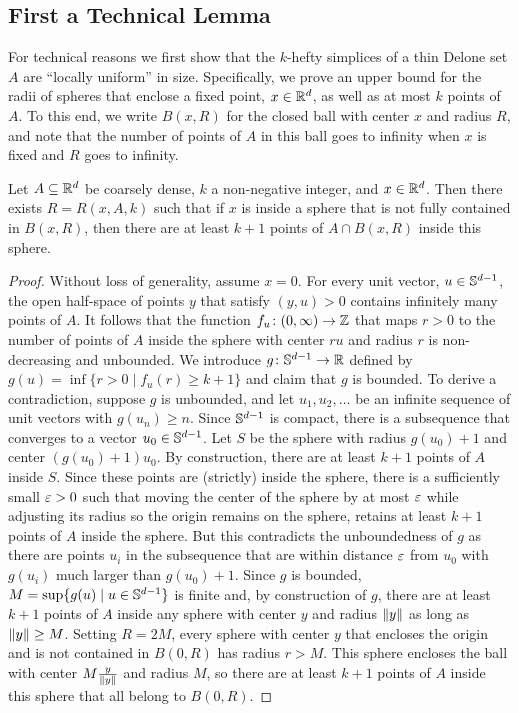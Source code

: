 \documentclass[a4paper,UKenglish,cleveref, autoref,numberwithinsect]{socg-lipics-v2021}
\newcommand {\mm}[1] {\ifmmode{#1}\else{\mbox{\(#1\)}}\fi}
\theoremstyle{plain}
\newcommand{\Rspace}        {\mm{{\mathbb R}}}
\newcommand{\Sspace}        {\mm{{\mathbb S}}}
\newcommand{\Zspace}        {\mm{{\mathbb Z}}}
\newcommand{\norm}[1]       {\mm{\|{#1}\|}}
\newcommand{\ee}            {\mm{\varepsilon}}
\begin{document}
\subsection{First a Technical Lemma}
\label{sec:2.1}
For technical reasons we first show that the $k$-hefty simplices of a thin Delone set $A$ are ``locally uniform'' in size.
Specifically, we prove an upper bound for the radii of spheres that enclose a fixed point, $x \in \Rspace^d$, as well as at most $k$ points of $A$.
To this end, we write $B(x,R)$ for the closed ball with center $x$ and radius $R$, and note that the number of points of $A$ in this ball goes to infinity when $x$ is fixed and $R$ goes to infinity.
\begin{lemma}
  \label{lem:hefty_simplices_have_bounded_radius}
  Let $A \subseteq \Rspace^d$ be coarsely dense, $k$ a non-negative integer, and $x \in \Rspace^d$.
  Then there exists $R = R(x,A,k)$ such that if $x$ is inside a sphere that is not fully contained in $B(x,R)$, then there are at least $k+1$ points of $A \cap B(x,R)$ inside this sphere.
\end{lemma}
\begin{proof}
  Without loss of generality, assume $x=0$. 
  For every unit vector, $u \in \Sspace^{d-1}$, the open half-space of points $y$ that satisfy $(y,u)>0$ contains infinitely many points of $A$. 
  It follows that the function $f_u \colon (0,\infty) \to \Zspace$ that maps $r > 0$ to the number of points of $A$ inside the sphere with center $ru$ and radius $r$ is non-decreasing and unbounded. 
  \smallskip
  We introduce $g \colon \Sspace^{d-1} \to \Rspace$ defined by $g(u) = \inf \{r > 0 \mid f_u(r)\geq k+1\}$ and claim that $g$ is bounded.
  To derive a contradiction, suppose $g$ is unbounded, and let $u_1, u_2, \ldots$ be an infinite sequence of unit vectors with $g(u_n) \geq n$.
  Since $\Sspace^{d-1}$ is compact, there is a subsequence that converges to a vector $u_0 \in \Sspace^{d-1}$.
  Let $S$ be the sphere with radius $g(u_0)+1$ and center $(g(u_0)+1) u_0$. 
  By construction, there are at least $k+1$ points of $A$ inside $S$.
  Since these points are (strictly) inside the sphere, there is a sufficiently small $\ee > 0$ such that moving the center of the sphere by at most $\ee$ while adjusting its radius so the origin remains on the sphere, retains at least $k+1$ points of $A$ inside the sphere.
  But this contradicts the unboundedness of $g$ as there are points $u_i$ in the subsequence that are within distance $\ee$ from $u_0$ with $g(u_i)$ much larger than $g(u_0)+1$.
  \smallskip
  Since $g$ is bounded, $M = \sup \{g(u) \mid u \in \Sspace^{d-1}\}$ is finite and, by construction of $g$, there are at least $k+1$ points of $A$ inside any sphere with center $y$ and radius $\norm{y}$ as long as $\norm{y} \geq M$.
  Setting $R = 2M$, every sphere with center $y$ that encloses the origin and is not contained in $B(0,R)$ has radius $r > M$.
  This sphere encloses the ball with center $M \frac{y}{\norm{y}}$ and radius $M$, so there are at least $k+1$ points of $A$ inside this sphere that all belong to $B(0,R)$.
\end{proof}
\end{document}
